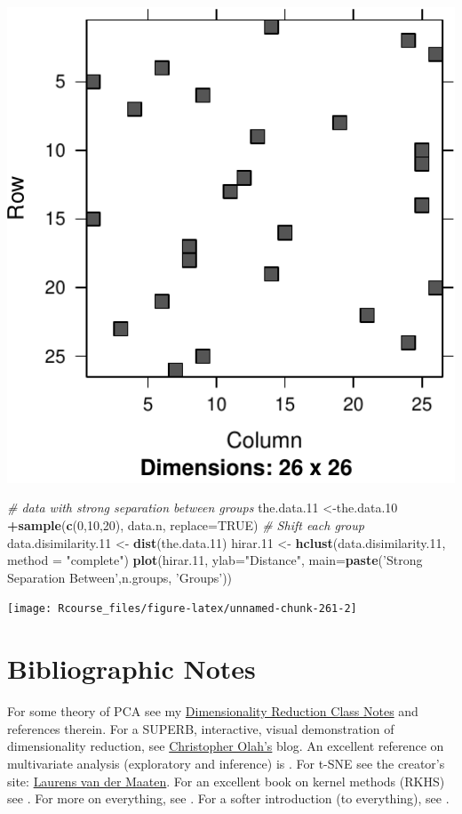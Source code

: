 \documentclass[]{book}
\newenvironment{Shaded}{\begin{snugshade}}{\end{snugshade}}
\newcommand{\KeywordTok}[1]{\textcolor[rgb]{0.13,0.29,0.53}{\textbf{#1}}}
\newcommand{\DataTypeTok}[1]{\textcolor[rgb]{0.13,0.29,0.53}{#1}}
\newcommand{\DecValTok}[1]{\textcolor[rgb]{0.00,0.00,0.81}{#1}}
\newcommand{\StringTok}[1]{\textcolor[rgb]{0.31,0.60,0.02}{#1}}
\newcommand{\CommentTok}[1]{\textcolor[rgb]{0.56,0.35,0.01}{\textit{#1}}}
\newcommand{\OtherTok}[1]{\textcolor[rgb]{0.56,0.35,0.01}{#1}}
\newcommand{\OperatorTok}[1]{\textcolor[rgb]{0.81,0.36,0.00}{\textbf{#1}}}
\newcommand{\NormalTok}[1]{#1}
\theoremstyle{definition}
\theoremstyle{definition}
\theoremstyle{definition}
\theoremstyle{remark}
\begin{document}
\includegraphics[width=0.5\linewidth]{Rcourse_files/figure-latex/unnamed-chunk-261-1}

\begin{Shaded}
\begin{Highlighting}[]
\CommentTok{# data with strong separation between groups}
\NormalTok{the.data.}\DecValTok{11}\NormalTok{ <-the.data.}\DecValTok{10} \OperatorTok{+}\KeywordTok{sample}\NormalTok{(}\KeywordTok{c}\NormalTok{(}\DecValTok{0}\NormalTok{,}\DecValTok{10}\NormalTok{,}\DecValTok{20}\NormalTok{), data.n, }\DataTypeTok{replace=}\OtherTok{TRUE}\NormalTok{) }\CommentTok{# Shift each group }
\NormalTok{data.disimilarity.}\DecValTok{11}\NormalTok{ <-}\StringTok{ }\KeywordTok{dist}\NormalTok{(the.data.}\DecValTok{11}\NormalTok{)}
\NormalTok{hirar.}\DecValTok{11}\NormalTok{ <-}\StringTok{ }\KeywordTok{hclust}\NormalTok{(data.disimilarity.}\DecValTok{11}\NormalTok{, }\DataTypeTok{method =} \StringTok{"complete"}\NormalTok{)}
\KeywordTok{plot}\NormalTok{(hirar.}\DecValTok{11}\NormalTok{, }\DataTypeTok{ylab=}\StringTok{"Distance"}\NormalTok{, }\DataTypeTok{main=}\KeywordTok{paste}\NormalTok{(}\StringTok{'Strong Separation Between'}\NormalTok{,n.groups, }\StringTok{'Groups'}\NormalTok{))}
\end{Highlighting}
\end{Shaded}

\texttt{[image: Rcourse\_files/figure-latex/unnamed-chunk-261-2]}

\section{Bibliographic Notes}\label{bibliographic-notes-9}

For some theory of PCA see my
\href{https://github.com/johnros/dim_reduce/blob/master/dim_reduce.pdf}{Dimensionality
Reduction Class Notes} and references therein. For a SUPERB,
interactive, visual demonstration of dimensionality reduction, see
\href{http://colah.github.io/posts/2014-10-Visualizing-MNIST/}{Christopher
Olah's} blog. An excellent reference on multivariate analysis
(exploratory and inference) is \citet{izenman2008modern}. For t-SNE see
the creator's site: \href{https://lvdmaaten.github.io/tsne/}{Laurens van
der Maaten}. For an excellent book on kernel methods (RKHS) see
\citet{shawe2004kernel}. For more on everything, see
\citet{friedman2001elements}. For a softer introduction (to everything),
see \citet{james2013introduction}.
\end{document}
